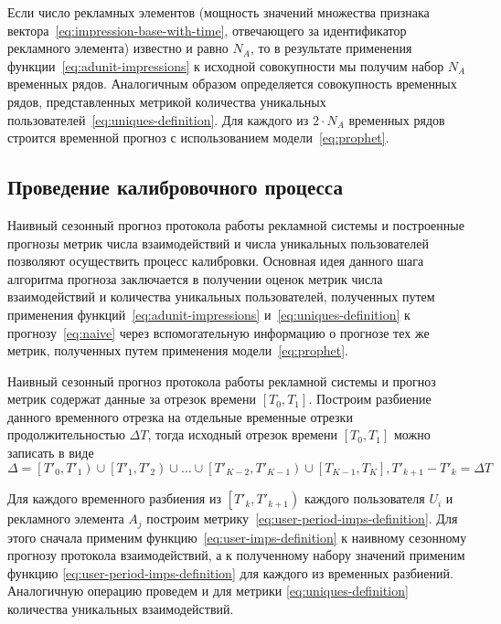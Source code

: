 Если число рекламных элементов (мощность значений множества признака вектора~\eqref{eq:impression-base-with-time},
отвечающего за идентификатор рекламного элемента) известно и равно $N_A$, то в результате применения 
функции~\eqref{eq:adunit-impressions} к исходной совокупности мы получим набор $N_A$ временных рядов. Аналогичным образом
определяется совокупность временных рядов, представленных метрикой количества уникальных 
пользователей~\eqref{eq:uniques-definition}. Для каждого из $2 \cdot N_A$ временных рядов строится временной прогноз
с использованием модели~\eqref{eq:prophet}.

\subsection{Проведение калибровочного процесса}
Наивный сезонный прогноз протокола работы рекламной системы и построенные прогнозы метрик числа взаимодействий и числа
уникальных пользователей позволяют осуществить процесс калибровки. Основная идея данного шага алгоритма прогноза заключается
в получении оценок метрик числа взаимодействий и количества уникальных пользователей, полученных путем применения 
функций~\eqref{eq:adunit-impressions} и~\eqref{eq:uniques-definition} к прогнозу~\eqref{eq:naive} через
вспомогательную информацию о прогнозе тех же метрик, полученных путем применения модели~\eqref{eq:prophet}.

Наивный сезонный прогноз протокола работы рекламной системы и прогноз метрик содержат данные за отрезок времени
$\left[T_0, T_1\right]$. Построим разбиение данного временного отрезка на отдельные временные отрезки 
продолжительностью $\Delta T$, тогда исходный отрезок времени $\left[T_0, T_1\right]$ можно записать в виде
\begin{equation}
    \Delta = \left[T'_0, T'_1\right) \cup \left[T'_1, T'_2\right)
    \cup \dots \cup \left[T'_{K-2}, T'_{K-1}\right) \cup \left[T_{K-1}, T_K\right], T'_{k+1} - T'_{k} = \Delta T
\end{equation}

Для каждого временного разбиения из $\left[T'_k, T'_{k+1}\right)$ каждого пользователя $U_i$ и рекламного элемента 
$A_j$ построим метрику~\eqref{eq:user-period-imps-definition}. Для этого сначала применим 
функцию~\eqref{eq:user-imps-definition} к наивному сезонному прогнозу протокола взаимодействий, а к полученному набору 
значений применим функцию \eqref{eq:user-period-imps-definition} для каждого из временных разбиений. Аналогичную 
операцию проведем и для метрики \eqref{eq:uniques-definition} количества уникальных взаимодействий.


